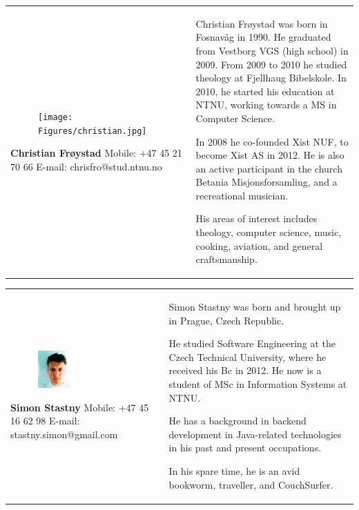 \documentclass[11pt]{book}
\begin{document}
\begin{table}[H]
\centering
\begin{tabular}{ p{7cm} p{7cm} }
\parbox{7cm}{
\begin{figure}[H]
      \texttt{[image: Figures/christian.jpg]}
      \label{fig:partners_group_christian}
\end{figure}
\textbf{Christian Frøystad}\\
Mobile: +47 45 21 70 66\\
E-mail: chrisfro@stud.ntnu.no} & \parbox{7cm}{
Christian Frøystad was born in Fosnavåg in 1990. He graduated from Vestborg VGS (high school) in 2009. From 2009 to 2010 he studied theology at Fjellhaug Bibelskole.
In 2010, he started his education at NTNU, working towards a MS in Computer Science.

In 2008 he co-founded Xist NUF, to become Xist AS in 2012.
He is also an active participant in the church Betania Misjonsforsamling, and a recreational musician.

His areas of interest includes theology, computer science, music, cooking, aviation, and general craftsmanship.
}
\end{tabular}
\label{tab:partners_group_christian}
\end{table}

\begin{table}[H]
\centering
\begin{tabular}{ p{7cm} p{7cm} }
\parbox{7cm}{
\begin{figure}[H]
      \includegraphics[width=0.4\textwidth]{Figures/simon.jpg}
      \label{fig:partners_group_simon}
\end{figure}
\textbf{Simon Stastny}\\
Mobile: +47 45 16 62 98\\
E-mail: stastny.simon@gmail.com} & \parbox{7cm}{
    
Simon Stastny was born and brought up in Prague, Czech Republic.

He studied Software Engineering at the Czech Technical University, where he received his Bc in 2012. He now is a student of MSc in Information Systems at NTNU.

He has a background in backend development in Java-related technologies in his past and present occupations.

In his spare time, he is an avid bookworm, traveller, and CouchSurfer.
}
\end{tabular}
\label{tab:partners_group_simon}
\end{table}
\end{document}

